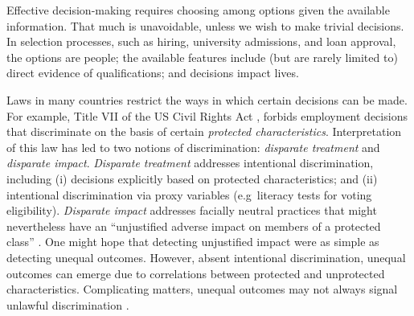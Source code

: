 Effective decision-making 
requires choosing among options 
given the available information.
That much is unavoidable, 
unless we wish to make trivial decisions.
In selection processes, 
such as hiring, university admissions, and loan approval, 
the options are people;
the available features include 
(but are rarely limited to) 
direct evidence of qualifications;
and decisions impact lives. 

Laws in many countries restrict 
the ways in which certain decisions can be made.
For example,
Title VII of the US Civil Rights Act \cite{CivilRights1964},
forbids employment decisions that discriminate 
on the basis of certain \emph{protected characteristics}.
Interpretation of this law 
has led to two notions of discrimination: 
\emph{disparate treatment} and \emph{disparate impact}.
%
%
\textit{Disparate treatment} 
addresses intentional discrimination, 
including 
(i) decisions explicitly based on protected characteristics; 
and (ii) intentional discrimination via proxy variables
(e.g~literacy tests for voting eligibility).
%
\textit{Disparate impact}
addresses facially neutral practices
that might nevertheless
have an ``unjustified adverse impact 
on members of a protected class'' \cite{CivilRights1964}.  
One might hope that detecting unjustified impact were as simple as detecting unequal outcomes.
However, absent intentional discrimination,
unequal outcomes can emerge due to correlations 
between protected and unprotected characteristics.
Complicating matters, unequal outcomes 
may not always signal unlawful discrimination \cite{AsianNYT}.


